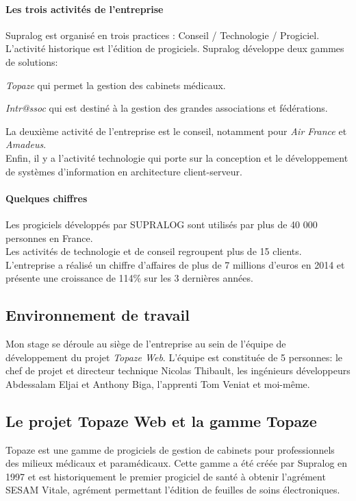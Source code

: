 \paragraph{Les trois activités de l'entreprise\\}
Supralog est organisé en trois practices : Conseil / Technologie / Progiciel.\\
L'activité historique est l'édition de progiciels. Supralog développe deux gammes de solutions:
\begin{sitemize}
\item \textit{Topaze} qui permet la gestion des cabinets médicaux.
\item \textit{Intr@ssoc} qui est destiné à la gestion des grandes associations et fédérations.
\end{sitemize}

La deuxième activité de l'entreprise est le conseil, notamment pour \textit{Air France} et \textit{Amadeus}.\\
Enfin, il y a l'activité technologie qui porte sur la conception et le développement de systèmes d'information en architecture client-serveur. 

\paragraph{Quelques chiffres\\}
Les progiciels développés par SUPRALOG sont utilisés par plus de 40 000 personnes en France.\\
Les activités de technologie et de conseil regroupent plus de 15 clients.\\
L'entreprise a réalisé un chiffre d'affaires de plus de 7 millions d'euros en 2014 et présente une croissance de 114\% sur les 3 dernières années.

\subsection{Environnement de travail}
Mon stage se déroule au siège de l'entreprise au sein de l'équipe de développement du projet \textit{Topaze Web}.
L'équipe est constituée de 5 personnes: le chef de projet et directeur technique Nicolas Thibault, les ingénieurs développeurs Abdessalam Eljai et Anthony Biga, l'apprenti Tom Veniat et moi-même.

\subsection{Le projet Topaze Web et la gamme Topaze}
Topaze est une gamme de progiciels de gestion de cabinets pour professionnels des milieux
médicaux et paramédicaux. Cette gamme a été créée par Supralog en 1997 et est historiquement le
premier progiciel de santé à obtenir l'agrément SESAM Vitale, agrément permettant l’édition de
feuilles de soins électroniques.\\

